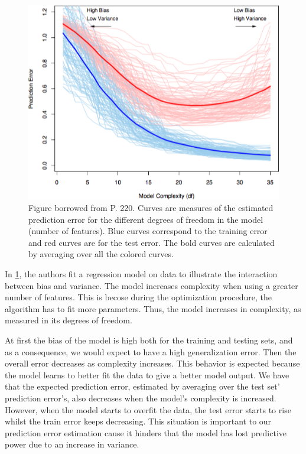 \begin{figure}[h!]
\begin{center}
\includegraphics[width=0.7\columnwidth]{figures/figure-biasVariance/figure-biasVariance}
\caption{\label{figure-biasVariance} Figure borrowed from \protect\textcite{hastie-elemstatslearn} P. 220. Curves are measures of the estimated prediction error for the different degrees of freedom in the model (number of features). Blue curves correspond to the training error and red curves are for the test error. The bold curves are calculated by averaging over all the colored curves.%
}
\end{center}
\end{figure}

In \cref{figure-biasVariance}, the authors fit a regression model on data to illustrate the interaction between bias and variance. The model increases complexity when using a greater number of features. This is becose during the optimization procedure, the algorithm has to fit more parameters. Thus, the model increases in complexity, as measured in its degrees of freedom.


At first the bias of the model is high both for the training and testing sets, and as a consequence, we would expect to have a high generalization error. Then the overall error decreases as complexity increases. This behavior is expected because the model learns to better fit the data to give a better model output. We have that the expected prediction error, estimated by averaging over the test set' prediction error's, also decreases when the model's complexity is increased. However, when the model starts to overfit the data, the test error starts to rise whilst the train error keeps decreasing. This situation is important to our prediction error estimation cause it hinders that the model has lost predictive power due to an increase in variance.

